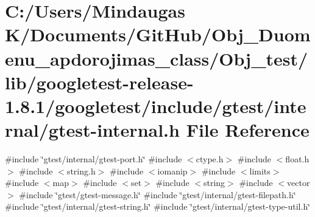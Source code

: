 \hypertarget{_obj__test_2lib_2googletest-release-1_88_81_2googletest_2include_2gtest_2internal_2gtest-internal_8h}{}\section{C\+:/\+Users/\+Mindaugas K/\+Documents/\+Git\+Hub/\+Obj\+\_\+\+Duomenu\+\_\+apdorojimas\+\_\+class/\+Obj\+\_\+test/lib/googletest-\/release-\/1.8.1/googletest/include/gtest/internal/gtest-\/internal.h File Reference}
\label{_obj__test_2lib_2googletest-release-1_88_81_2googletest_2include_2gtest_2internal_2gtest-internal_8h}
{\ttfamily \#include \char`\"{}gtest/internal/gtest-\/port.\+h\char`\"{}}\newline
{\ttfamily \#include $<$ctype.\+h$>$}\newline
{\ttfamily \#include $<$float.\+h$>$}\newline
{\ttfamily \#include $<$string.\+h$>$}\newline
{\ttfamily \#include $<$iomanip$>$}\newline
{\ttfamily \#include $<$limits$>$}\newline
{\ttfamily \#include $<$map$>$}\newline
{\ttfamily \#include $<$set$>$}\newline
{\ttfamily \#include $<$string$>$}\newline
{\ttfamily \#include $<$vector$>$}\newline
{\ttfamily \#include \char`\"{}gtest/gtest-\/message.\+h\char`\"{}}\newline
{\ttfamily \#include \char`\"{}gtest/internal/gtest-\/filepath.\+h\char`\"{}}\newline
{\ttfamily \#include \char`\"{}gtest/internal/gtest-\/string.\+h\char`\"{}}\newline
{\ttfamily \#include \char`\"{}gtest/internal/gtest-\/type-\/util.\+h\char`\"{}}\newline
